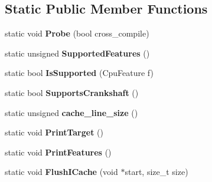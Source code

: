 \subsection*{Static Public Member Functions}
\begin{DoxyCompactItemize}
\item 
\hypertarget{classv8_1_1internal_1_1_cpu_features_a81ae78f6f799c911bf55ca0e4099b6aa}{}static void {\bfseries Probe} (bool cross\+\_\+compile)\label{classv8_1_1internal_1_1_cpu_features_a81ae78f6f799c911bf55ca0e4099b6aa}

\item 
\hypertarget{classv8_1_1internal_1_1_cpu_features_a481a85a8743cc9ef2303e3d9d58d4869}{}static unsigned {\bfseries Supported\+Features} ()\label{classv8_1_1internal_1_1_cpu_features_a481a85a8743cc9ef2303e3d9d58d4869}

\item 
\hypertarget{classv8_1_1internal_1_1_cpu_features_a44305c4c7840c90b5cf4a0b6ebd791af}{}static bool {\bfseries Is\+Supported} (Cpu\+Feature f)\label{classv8_1_1internal_1_1_cpu_features_a44305c4c7840c90b5cf4a0b6ebd791af}

\item 
\hypertarget{classv8_1_1internal_1_1_cpu_features_a5157408e45df8e061006ec0dbe6292e1}{}static bool {\bfseries Supports\+Crankshaft} ()\label{classv8_1_1internal_1_1_cpu_features_a5157408e45df8e061006ec0dbe6292e1}

\item 
\hypertarget{classv8_1_1internal_1_1_cpu_features_add8eac7ac035ec3e6eda772a7a951bf4}{}static unsigned {\bfseries cache\+\_\+line\+\_\+size} ()\label{classv8_1_1internal_1_1_cpu_features_add8eac7ac035ec3e6eda772a7a951bf4}

\item 
\hypertarget{classv8_1_1internal_1_1_cpu_features_a9db700f7f56524d827e19fd44ef7a07e}{}static void {\bfseries Print\+Target} ()\label{classv8_1_1internal_1_1_cpu_features_a9db700f7f56524d827e19fd44ef7a07e}

\item 
\hypertarget{classv8_1_1internal_1_1_cpu_features_a9b099faa5af8ce6e4e6d455590c14189}{}static void {\bfseries Print\+Features} ()\label{classv8_1_1internal_1_1_cpu_features_a9b099faa5af8ce6e4e6d455590c14189}

\item 
\hypertarget{classv8_1_1internal_1_1_cpu_features_a3c49200d3b4432aee11586ed15cd49b7}{}static void {\bfseries Flush\+I\+Cache} (void $\ast$start, size\+\_\+t size)\label{classv8_1_1internal_1_1_cpu_features_a3c49200d3b4432aee11586ed15cd49b7}

\end{DoxyCompactItemize}
